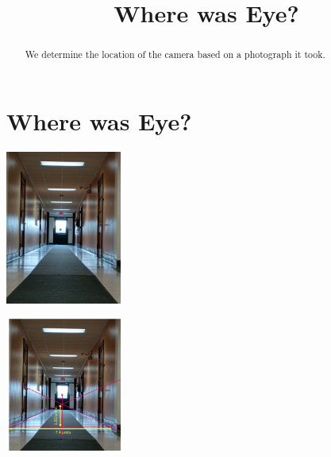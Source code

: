 \documentclass{ximera}
\title{Where was Eye?} \license{CC BY-NC-SA 4.0}
\begin{document}
\begin{abstract}
We determine the location of the camera based on a photograph it took.
\end{abstract}
\maketitle

\section*{Where was Eye?}

\begin{image}
         \includegraphics[width=1.5in]{hall1.jpg}
\end{image}

\begin{image}
         \includegraphics[width=1.5in]{hall2.jpg}
\end{image}

\begin{onlineOnly}
\begin{center}
\end{center}
\end{onlineOnly}

\begin{onlineOnly}
\begin{center}
\end{center}
\end{onlineOnly}

\begin{onlineOnly}
\begin{center} 
\end{center}
\end{onlineOnly}
\end{document}
